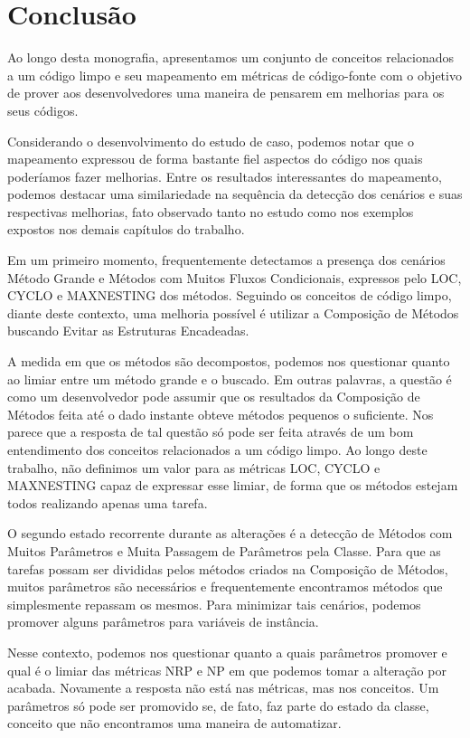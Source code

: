 \chapter{Conclusão}
\label{chap:conclusao}

Ao longo desta monografia, apresentamos um conjunto de conceitos relacionados a um código limpo e
seu mapeamento em métricas de código-fonte com o objetivo de prover aos desenvolvedores uma maneira
de pensarem em melhorias para os seus códigos.

Considerando o desenvolvimento do estudo de caso, podemos notar que o mapeamento expressou de forma
bastante fiel aspectos do código nos quais poderíamos fazer melhorias.  Entre os resultados interessantes
do mapeamento, podemos destacar uma similariedade na sequência da detecção dos cenários e suas respectivas
melhorias, fato observado tanto no estudo como nos exemplos expostos nos demais capítulos do trabalho.

Em um primeiro momento, frequentemente detectamos a presença dos cenários Método Grande e Métodos com Muitos 
Fluxos Condicionais, expressos pelo LOC, CYCLO e MAXNESTING dos métodos. Seguindo os conceitos de código limpo,
diante deste contexto, uma melhoria possível é utilizar a Composição de Métodos buscando Evitar as Estruturas
Encadeadas.

A medida em que os métodos são decompostos, podemos nos questionar quanto ao limiar entre um método grande e o buscado.
Em outras palavras, a questão é como um desenvolvedor pode assumir que os resultados da Composição de Métodos
feita até o dado instante obteve métodos pequenos o suficiente. Nos parece que a resposta de tal questão só pode
ser feita através de um bom entendimento dos conceitos relacionados a um código limpo. Ao longo deste trabalho,
não definimos um valor para as métricas LOC, CYCLO e MAXNESTING capaz de expressar esse limiar, de forma que os
métodos estejam todos realizando apenas uma tarefa.

O segundo estado recorrente durante as alterações é a detecção de Métodos com Muitos Parâmetros e Muita Passagem
de Parâmetros pela Classe. Para que as tarefas possam ser divididas pelos métodos criados na Composição de Métodos,
muitos parâmetros são necessários e frequentemente encontramos métodos que simplesmente repassam os mesmos.
Para minimizar tais cenários, podemos promover alguns parâmetros para variáveis de instância.

Nesse contexto, podemos nos questionar quanto a quais parâmetros promover e qual é o limiar das métricas NRP e NP
em que podemos tomar a alteração por acabada. Novamente a resposta não está nas métricas, mas nos conceitos.
Um parâmetros só pode ser promovido se, de fato, faz parte do estado da classe, conceito que não encontramos
uma maneira de automatizar.

